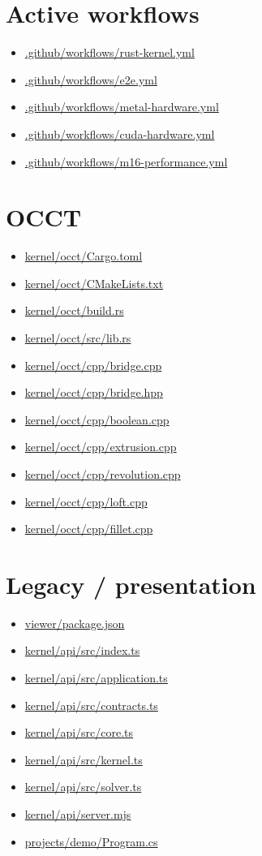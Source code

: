 \documentclass[11pt,a4paper]{report}
\newcommand{\pathref}[1]{\url{#1}}
\begin{document}
\section{Active workflows}
\begin{itemize}
\item \pathref{.github/workflows/rust-kernel.yml}
\item \pathref{.github/workflows/e2e.yml}
\item \pathref{.github/workflows/metal-hardware.yml}
\item \pathref{.github/workflows/cuda-hardware.yml}
\item \pathref{.github/workflows/m16-performance.yml}
\end{itemize}

\section{OCCT}
\begin{itemize}
\item \pathref{kernel/occt/Cargo.toml}
\item \pathref{kernel/occt/CMakeLists.txt}
\item \pathref{kernel/occt/build.rs}
\item \pathref{kernel/occt/src/lib.rs}
\item \pathref{kernel/occt/cpp/bridge.cpp}
\item \pathref{kernel/occt/cpp/bridge.hpp}
\item \pathref{kernel/occt/cpp/boolean.cpp}
\item \pathref{kernel/occt/cpp/extrusion.cpp}
\item \pathref{kernel/occt/cpp/revolution.cpp}
\item \pathref{kernel/occt/cpp/loft.cpp}
\item \pathref{kernel/occt/cpp/fillet.cpp}
\end{itemize}

\section{Legacy / presentation}
\begin{itemize}
\item \pathref{viewer/package.json}
\item \pathref{kernel/api/src/index.ts}
\item \pathref{kernel/api/src/application.ts}
\item \pathref{kernel/api/src/contracts.ts}
\item \pathref{kernel/api/src/core.ts}
\item \pathref{kernel/api/src/kernel.ts}
\item \pathref{kernel/api/src/solver.ts}
\item \pathref{kernel/api/server.mjs}
\item \pathref{projects/demo/Program.cs}
\end{itemize}
\end{document}

